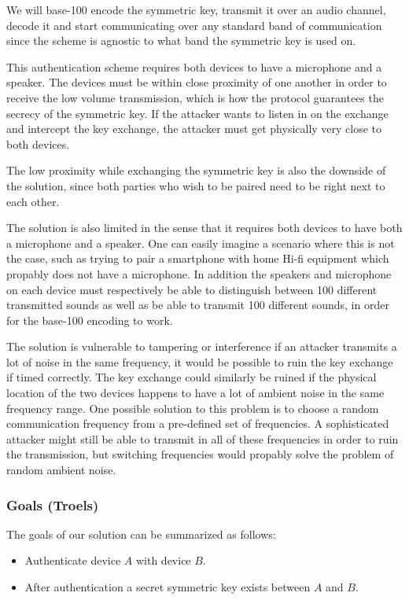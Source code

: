 \documentclass[12pt]{article}
\begin{document}
We will base-100 encode the symmetric key, transmit it over an audio channel, decode it and start communicating over any standard band of communication since the scheme is agnostic to what band the symmetric key is used on.

This authentication scheme requires both devices to have a microphone and a speaker.
The devices must be within close proximity of one another in order to receive the low volume transmission, which is how the protocol guarantees the secrecy of the symmetric key. If the attacker wants to listen in on the exchange and intercept the key exchange, the attacker must get physically very close to both devices.

The low proximity while exchanging the symmetric key is also the downside of the solution, since both parties who wish to be paired need to be right next to each other.

The solution is also limited in the sense that it requires both devices to have both a microphone and a speaker. One can easily imagine a scenario where this is not the case, such as trying to pair a smartphone with home Hi-fi equipment which propably does not have a microphone. In addition the speakers and microphone on each device must respectively be able to distinguish between 100 different transmitted sounds as well as be able to transmit 100 different sounds, in order for the base-100 encoding to work.

The solution is vulnerable to tampering or interference if an attacker transmits a lot of noise in the same frequency, it would be possible to ruin the key exchange if timed correctly. The key exchange could similarly be ruined if the physical location of the two devices happens to have a lot of ambient noise in the same frequency range.
One possible solution to this problem is to choose a random communication frequency from a pre-defined set of frequencies. A sophisticated attacker might still be able to transmit in all of these frequencies in order to ruin the transmission, but switching frequencies would propably solve the problem of random ambient noise.

\subsubsection{Goals (Troels)}
\label{subs:Goals}

The goals of our solution can be summarized as follows:

\begin{itemize}
    \item Authenticate device $A$ with device $B$.
    \item After authentication a secret symmetric key exists between $A$ and $B$.
\end{itemize}
\end{document}
